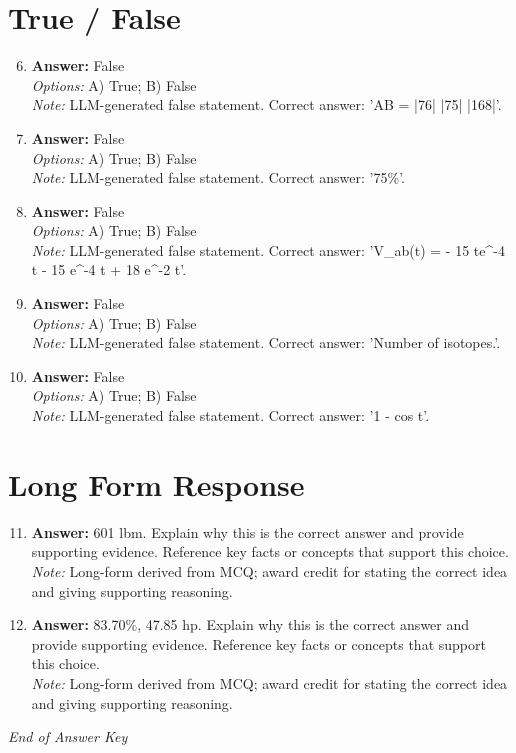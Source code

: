 \documentclass[12pt]{article}
\begin{document}
\section*{True / False}
\begin{enumerate}[label=\arabic*.]
\setcounter{enumi}{5}
\item \textbf{Answer:} False
\\ \textit{Options:} A) True; B) False
\\ \textit{Note:} LLM-generated false statement. Correct answer: 'AB = |76| |75| |168|'.
\item \textbf{Answer:} False
\\ \textit{Options:} A) True; B) False
\\ \textit{Note:} LLM-generated false statement. Correct answer: '75\%'.
\item \textbf{Answer:} False
\\ \textit{Options:} A) True; B) False
\\ \textit{Note:} LLM-generated false statement. Correct answer: 'V\_ab(t) = - 15 te^-4 t - 15 e^-4 t + 18 e^-2 t'.
\item \textbf{Answer:} False
\\ \textit{Options:} A) True; B) False
\\ \textit{Note:} LLM-generated false statement. Correct answer: 'Number of isotopes.'.
\item \textbf{Answer:} False
\\ \textit{Options:} A) True; B) False
\\ \textit{Note:} LLM-generated false statement. Correct answer: '1 - cos t'.
\end{enumerate}

\section*{Long Form Response}
\begin{enumerate}[label=\arabic*.]
\setcounter{enumi}{10}
\item \textbf{Answer:} 601 lbm. Explain why this is the correct answer and provide supporting evidence. Reference key facts or concepts that support this choice.
\\ \textit{Note:} Long-form derived from MCQ; award credit for stating the correct idea and giving supporting reasoning.
\item \textbf{Answer:} 83.70\%, 47.85 hp. Explain why this is the correct answer and provide supporting evidence. Reference key facts or concepts that support this choice.
\\ \textit{Note:} Long-form derived from MCQ; award credit for stating the correct idea and giving supporting reasoning.
\end{enumerate}

\vfill
\noindent\textit{End of Answer Key}
\end{document}
